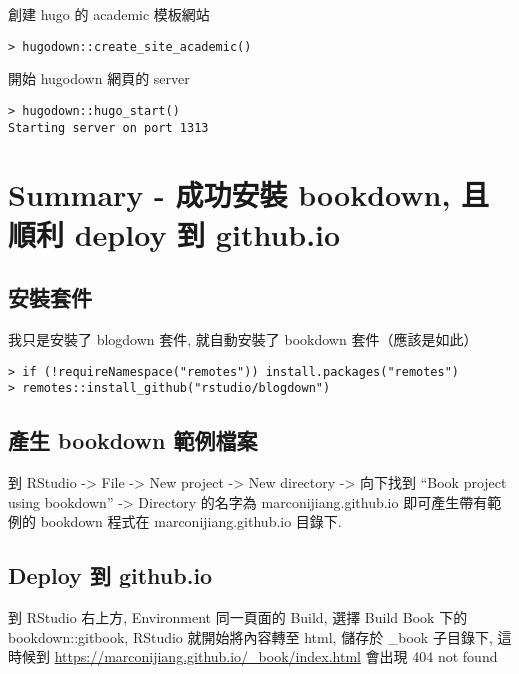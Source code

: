 \documentclass[
]{book}
\begin{document}
創建 hugo 的 academic 模板網站

\begin{verbatim}
> hugodown::create_site_academic()
\end{verbatim}

開始 hugodown 網頁的 server

\begin{verbatim}
> hugodown::hugo_start()
Starting server on port 1313
\end{verbatim}

\hypertarget{chap-summary}{%
\chapter{Summary - 成功安裝 bookdown, 且順利 deploy 到 github.io}\label{chap-summary}}

\hypertarget{ux5b89ux88ddux5957ux4ef6}{%
\section{安裝套件}\label{ux5b89ux88ddux5957ux4ef6}}

我只是安裝了 blogdown 套件, 就自動安裝了 bookdown 套件（應該是如此）

\begin{verbatim}
> if (!requireNamespace("remotes")) install.packages("remotes")  
> remotes::install_github("rstudio/blogdown")
\end{verbatim}

\hypertarget{ux7522ux751f-bookdown-ux7bc4ux4f8bux6a94ux6848}{%
\section{產生 bookdown 範例檔案}\label{ux7522ux751f-bookdown-ux7bc4ux4f8bux6a94ux6848}}

到 RStudio -\textgreater{} File -\textgreater{} New project -\textgreater{} New directory -\textgreater{} 向下找到 ``Book project using bookdown'' -\textgreater{} Directory 的名字為 marconijiang.github.io 即可產生帶有範例的 bookdown 程式在 marconijiang.github.io 目錄下.

\hypertarget{deploy-ux5230-github.io}{%
\section{Deploy 到 github.io}\label{deploy-ux5230-github.io}}

到 RStudio 右上方, Environment 同一頁面的 Build, 選擇 Build Book 下的 bookdown::gitbook, RStudio 就開始將內容轉至 html, 儲存於 \_book 子目錄下, 這時候到 \url{https://marconijiang.github.io/_book/index.html} 會出現 404 not found
\end{document}
